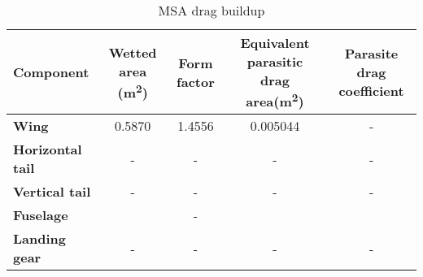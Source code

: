 \begin{table}[H]
\centering

    \begin{tabular}{@{}lcccc@{}}
    \toprule
    \textbf{Component}       & \textbf{Wetted area (\si{\meter\squared})} & \textbf{Form factor} & \textbf{Equivalent parasitic drag area(\si{\meter\squared})} & \textbf{Parasite drag coefficient} \\ \midrule
    \textbf{Wing}            & 0.5870                    &    1.4556             & 0.005044                                      & -                                  \\
    \textbf{Horizontal tail} & -                    &    -             & -                                      & -                                  \\
    \textbf{Vertical tail}   & -                    &   -               & -                                      & -                                  \\
    \textbf{Fuselage}        &                      & -                    &                                        &                                    \\
    \textbf{Landing gear}    & -                    & -                    & -                                      & -                                  \\ \bottomrule
    \end{tabular}
\caption{MSA drag buildup}
\label{tab:msa_drag_polar}
\end{table}